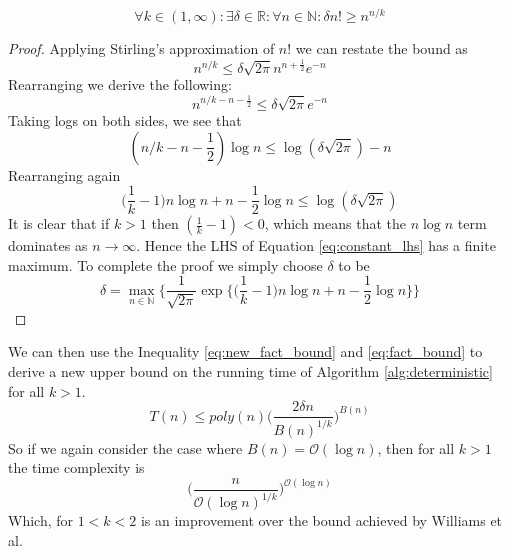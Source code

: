 \begin{equation} \label{eq:new_fact_bound}
    \forall k \in (1, \infty): \exists \delta \in \mathbb{R}: \forall n \in \mathbb{N}: \delta n! \geq n^{n / k}
\end{equation}
\begin{proof}
    Applying Stirling's approximation of $n!$ we can restate the bound as
    \begin{equation*}
        n^{n / k} \leq \delta\sqrt{2\pi} n^{n + \frac{1}{2}} e^{-n}
    \end{equation*}
    Rearranging we derive the following:
    \begin{equation*}
        n^{n / k - n - \frac{1}{2}} \leq \delta\sqrt{2\pi} e^{-n}
    \end{equation*}
    Taking logs on both sides, we see that
    \begin{equation*}
        (n / k - n - \frac{1}{2})\log n \leq \log (\delta\sqrt{2\pi}) - n
    \end{equation*}
    Rearranging again
    \begin{equation} \label{eq:constant_lhs}
        \Big(\frac{1}{k} - 1\Big)n \log n + n - \frac{1}{2}\log n \leq \log (\delta\sqrt{2\pi})
    \end{equation}
    It is clear that if $k > 1$ then $(\frac{1}{k} - 1) < 0$, which means
    that the $n\log n$ term dominates as $n \to \infty$. Hence the LHS of Equation
    \ref{eq:constant_lhs} has a finite maximum.
    To complete the proof we simply choose $\delta$ to be
    \begin{equation}
        \delta = \max_{n \in \mathbb{N}} \Bigg\{
        \frac{1}{\sqrt{2\pi}}\exp \Big\{ \Big(\frac{1}{k} - 1 \Big)n \log n + n - \frac{1}{2}\log n \Big\} \Bigg\}
    \end{equation}
\end{proof}

We can then use the Inequality \ref{eq:new_fact_bound} and \ref{eq:fact_bound}
to derive a new upper bound on the running time of Algorithm \ref{alg:deterministic} for all $k > 1$.
\begin{equation} \label{eq:new_det_bound}
    T(n) \leq poly(n)\Big( \frac{2\delta n}{B(n)^{1 / k}} \Big)^{B(n)}
\end{equation}
So if we again consider the case where $B(n) = \mathcal{O}(\log n)$, then
for all $k > 1$ the time complexity is
\begin{equation}
   \Bigg( \frac{n}{\mathcal{O}(\log n)^{1 / k}} \Bigg)^{\mathcal{O}(\log n)}
\end{equation}
Which, for $1 < k < 2$ is an improvement over the bound achieved by
Williams et al.

